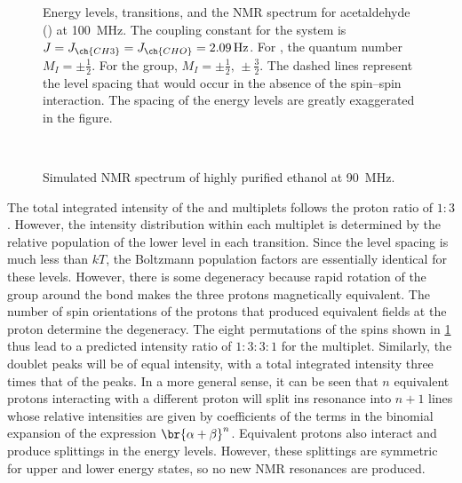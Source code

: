\begin{figure}[htb]
  \centering
  
  \caption{Energy levels, transitions, and the NMR spectrum for acetaldehyde () at \qty{100}{\MHz}. 
  The coupling constant for the system is \( {J = J_{\ch{CH3}} = J_{\ch{CHO}} = \qty{2.09}{\Hz}} \). 
  For , the quantum number \( {M_I = \pm\tfrac{1}{2}} \). For the  group, \( {M_I = \pm\tfrac{1}{2}, \, \pm\tfrac{3}{2}} \). 
  The dashed lines represent the level spacing that would occur in the absence of the spin--spin interaction.
  The spacing of the energy levels are greatly exaggerated in the figure.}
  \label{fig:spin_splitting}
\end{figure}  

\begin{figure}[htb]
  \centering
  
	\caption{Simulated NMR spectrum of highly purified ethanol at \qty{90}{\MHz}.}\
	\label{fig:EtOH_spectrum}
\end{figure}
The total integrated intensity of the  and  multiplets follows the proton ratio of \( 1{:}3 \). 
However, the intensity distribution within each multiplet is determined by the relative population of the lower level in each transition. 
Since the level spacing is much less than \( kT \), the Boltzmann population factors are essentially identical for these levels. 
However, there is some degeneracy because rapid rotation of the  group around the \ch{C-C} bond makes the three protons magnetically equivalent. 
The number of spin orientations of the  protons that produced equivalent fields at the  proton determine the degeneracy. 
The eight permutations of the  spins shown in \cref{fig:spin_splitting} thus lead to a predicted intensity ratio of \( 1{:}3{:}3{:}1 \) for the  multiplet. 
Similarly, the \ch{CH3} doublet peaks will be of equal intensity, with a total integrated intensity three times that of the \ch{CH} peaks. 
In a more general sense, it can be seen that \( n \) equivalent protons interacting with a different proton will split ins resonance into \( n + 1 \) lines whose relative intensities are given by coefficients of the terms in the binomial expansion of the expression \( \br{\alpha + \beta}^n \). 
Equivalent protons also interact and produce splittings in the energy levels. 
However, these splittings are symmetric for upper and lower energy states, so no new NMR resonances are produced. 
